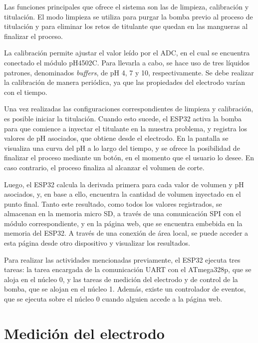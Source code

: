 Las funciones principales que ofrece el sistema son las de limpieza, calibración y titulación. El modo limpieza se utiliza para purgar la bomba previo al proceso de titulación y para eliminar los retos de titulante que quedan en las mangueras al finalizar el proceso. 

La calibración permite ajustar el valor leído por el ADC, en el cual se encuentra conectado el módulo pH4502C. Para llevarla a cabo, se hace uso de tres líquidos patrones, denominados \textit{buffers}, de pH 4, 7 y 10, respectivamente. Se debe realizar la calibración de manera periódica, ya que las propiedades del electrodo varían con el tiempo.

Una vez realizadas las configuraciones correspondientes de limpieza y calibración, es posible iniciar la titulación. Cuando esto sucede, el ESP32 activa  la bomba para que comience a inyectar el titulante en la muestra problema, y registra los valores de pH asociados, que obtiene desde el electrodo. En la pantalla se visualiza una curva del pH a lo largo del tiempo, y se ofrece la posibilidad de finalizar el proceso mediante un botón, en el momento que el usuario lo desee. En caso contrario, el proceso finaliza al alcanzar el volumen de corte.

Luego, el ESP32 calcula la derivada primera para cada valor de volumen y pH asociados, y, en base a ello, encuentra la cantidad de volumen inyectado en el punto final. Tanto este resultado, como todos los valores registrados, se almacenan en la memoria micro SD, a través de una comunicación SPI con el módulo correspondiente, y en la página web, que se encuentra embebida en la memoria del ESP32. A través de una conexión de área local, se puede acceder a esta página desde otro dispositivo y visualizar los resultados.

Para realizar las actividades mencionadas previamente, el ESP32 ejecuta tres tareas: la tarea encargada de la comunicación UART con el ATmega328p, que se aloja en el núcleo 0, y las tareas de medición del electrodo y de control de la bomba, que se alojan en el núcleo 1. Además, existe un controlador de eventos, que se ejecuta sobre el núcleo 0 cuando alguien accede a la página web.


\section{Medición del electrodo}

